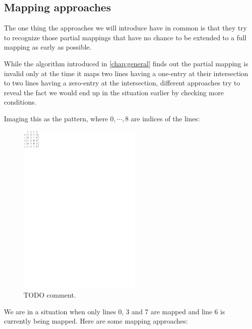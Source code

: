 \subsection{Mapping approaches}
\label{sect:approaches}
The one thing the approaches we will introduce have in common is that they try to recognize those partial mappings that have no chance to be extended to a full mapping as early as possible.

While the algorithm introduced in \autoref{chap:general} finds out the partial mapping is invalid only at the time it maps two lines having a one-entry at their intersection to two lines having a zero-entry at the intersection, different approaches try to reveal the fact we would end up in the situation earlier by checking more conditions.

Imaging this as the pattern, where $0,\cdots,8$ are indices of the lines:
\begin{figure}[h!]
\centering
\includegraphics[width=60mm]{../img/approaches.pdf}
\caption{TODO comment.}
\label{approaches}
\end{figure}

We are in a situation when only lines 0, 3 and 7 are mapped and line 6 is currently being mapped. Here are some mapping approaches:
